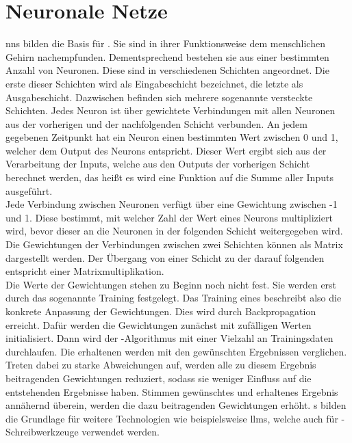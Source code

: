 \documentclass[../main.tex]{subfiles}
\begin{document}
\section{Neuronale Netze}

\glspl{nn} bilden die Basis für . Sie sind in ihrer Funktionsweise dem menschlichen Gehirn nachempfunden. Dementsprechend bestehen sie aus einer 
bestimmten Anzahl von Neuronen. Diese sind in verschiedenen Schichten angeordnet. Die erste dieser Schichten wird als Eingabeschicht bezeichnet, die letzte als Ausgabeschicht. Dazwischen 
befinden sich mehrere sogenannte versteckte Schichten. Jedes Neuron ist über gewichtete Verbindungen mit allen Neuronen aus der vorherigen und der nachfolgenden Schicht verbunden. 
An jedem gegebenen Zeitpunkt hat ein Neuron einen bestimmten Wert zwischen 0 und 1, welcher dem Output des Neurons entspricht. Dieser Wert ergibt sich aus der Verarbeitung der Inputs, welche 
aus den Outputs der vorherigen Schicht berechnet werden, das heißt es wird eine Funktion auf die Summe aller Inputs ausgeführt. \\
Jede Verbindung zwischen Neuronen verfügt über eine Gewichtung zwischen -1 und 1. Diese bestimmt, mit welcher Zahl der Wert eines Neurons multipliziert wird, bevor dieser an die Neuronen in 
der folgenden Schicht weitergegeben wird. Die Gewichtungen der Verbindungen zwischen zwei Schichten können als Matrix dargestellt werden. Der Übergang von einer 
Schicht zu der darauf folgenden entspricht einer Matrixmultiplikation. \\
Die Werte der Gewichtungen stehen zu Beginn noch nicht fest. Sie werden erst durch das sogenannte Training festgelegt. Das Training eines  beschreibt also die konkrete Anpassung der 
Gewichtungen. Dies wird durch Backpropagation erreicht. Dafür werden die Gewichtungen zunächst mit zufälligen Werten initialisiert. Dann wird der -Algorithmus mit einer Vielzahl an 
Trainingsdaten durchlaufen. Die erhaltenen werden mit den gewünschten Ergebnissen verglichen. Treten dabei zu starke Abweichungen auf, werden alle zu diesem Ergebnis beitragenden 
Gewichtungen reduziert, sodass sie weniger Einfluss auf die entstehenden Ergebnisse haben. Stimmen gewünschtes und erhaltenes Ergebnis annähernd überein, werden die dazu beitragenden 
Gewichtungen erhöht. s bilden die Grundlage für weitere Technologien wie beispielsweise \glspl{llm}, welche auch für -Schreibwerkzeuge verwendet werden. 
\end{document}
